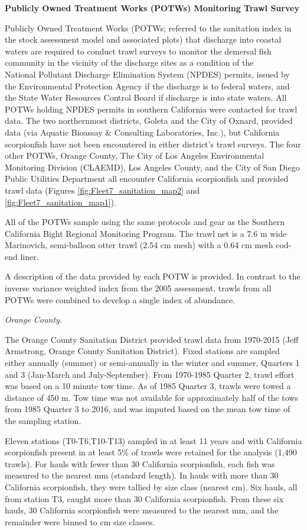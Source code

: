 \documentclass[12pt,]{article}
\begin{document}
\textbf{Publicly Owned Treatment Works (POTWs) Monitoring Trawl Survey}

Publicly Owned Treatment Works (POTWs; referred to the sanitation index
in the stock assessment model and associated plots) that discharge into
coastal waters are required to conduct trawl surveys to monitor the
demersal fish community in the vicinity of the discharge sites as a
condition of the\\
National Pollutant Discharge Elimination System (NPDES) permits, issued
by the Environmental Protection Agency if the discharge is to federal
waters, and the State Water Resources Control Board if discharge is into
state waters. All POTWs holding NPDES permits in southern California
were contacted for trawl data. The two northernmost districts, Goleta
and the City of Oxnard, provided data (via Aquatic Bioassay \&
Consulting Laboratories, Inc.), but California scorpionfish have not
been encountered in either district's trawl surveys. The four other
POTWs, Orange County, The City of Los Angeles Environmental Monitoring
Division (CLAEMD), Los Angeles County, and the City of San Diego Public
Utilities Department all encounter California scorpionfish and provided
trawl data (Figures \ref{fig:Fleet7_sanitation_map2} and
\ref{fig:Fleet7_sanitation_map1}).

All of the POTWs sample using the same protocols and gear as the
Southern California Bight Regional Monitoring Program. The trawl net is
a 7.6 m wide Marinovich, semi-balloon otter trawl (2.54 cm mesh) with a
0.64 cm mesh cod-end liner.

A description of the data provided by each POTW is provided. In contrast
to the inverse variance weighted index from the 2005 assessment, trawls
from all POTWs were combined to develop a single index of abundance.

\emph{Orange County}.

The Orange County Sanitation District provided trawl data from 1970-2015
(Jeff Armstrong, Orange County Sanitation District). Fixed stations are
sampled either annually (summer) or semi-annually in the winter and
summer, Quarters 1 and 3 (Jan-March and July-September). From 1970-1985
Quarter 2, trawl effort was based on a 10 minute tow time. As of 1985
Quarter 3, trawls were towed a distance of 450 m. Tow time was not
available for approximately half of the tows from 1985 Quarter 3 to
2016, and was imputed based on the mean tow time of the sampling
station.

Eleven stations (T0-T6,T10-T13) sampled in at least 11 years and with
California scorpionfish present in at least 5\% of trawls were retained
for the analysis (1,490 trawls). For hauls with fewer than 30 California
scorpionfish, each fish was measured to the nearest mm (standard
length). In hauls with more than 30 California scorpionfish, they were
tallied by size class (nearest cm). Six hauls, all from station T3,
caught more than 30 California scorpionfish. From these six hauls, 30
California scorpionfish were measured to the nearest mm, and the
remainder were binned to cm size classes.
\end{document}
